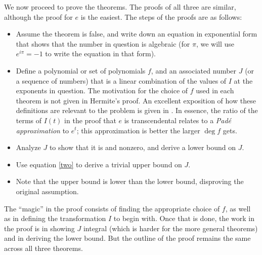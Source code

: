 \documentclass[12pt]{article}
\begin{document}
We now proceed to prove the theorems. The proofs of all three are similar, although the proof for $e$ is the easiest. The steps of the proofs are as follows:
\begin{itemize}
\item Assume the theorem is false, and write down an equation in exponential form that shows that the number in question is algebraic (for $\pi$, we will use $\displaystyle e^{i\pi}=-1$ to write the equation in that form).
\item Define a polynomial or set of polynomials $f$, and an associated number $J$ (or a sequence of numbers) that is a linear combination of the values of $I$ at the exponents in question. The motivation for the choice of $f$ used in each theorem is not given in Hermite's proof. An excellent exposition of how these definitions are relevant to the problem is given in \cite{bib:cohn}. In essence, the ratio of the terms of $I(t)$ in the proof that $e$ is transcendental relates to a \emph{Pad\'{e} approximation} to $e^t$; this approximation is better the larger $\deg f$ gets.
\item Analyze $J$ to show that it is  and nonzero, and derive a lower bound on $J$.
\item Use equation \eqref{two} to derive a trivial upper bound on $J$.
\item Note that the upper bound is lower than the lower bound, disproving the original assumption.
\end{itemize}
The ``magic'' in the proof consists of finding the appropriate choice of $f$, as well as in defining the transformation $I$ to begin with. Once that is done, the work in the proof is in showing $J$ integral (which is harder for the more general theorems) and in deriving the lower bound. But the outline of the proof remains the same across all three theorems.
\end{document}

